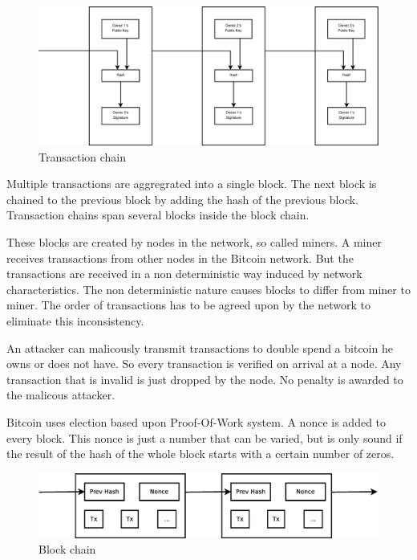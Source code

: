 \begin{figure}[H]
	\centerline{\includegraphics[scale=0.3]{problemDescription/figs/transactions.eps}}
	\caption{Transaction chain}
\end{figure}

Multiple transactions are aggregrated into a single block.
The next block is chained to the previous block by adding the hash of the previous block.
Transaction chains span several blocks inside the block chain.

These blocks are created by nodes in the network, so called miners.
A miner receives transactions from other nodes in the Bitcoin network.
But the transactions are received in a non deterministic way induced by network characteristics.
The non deterministic nature causes blocks to differ from miner to miner.
The order of transactions has to be agreed upon by the network to eliminate this inconsistency.

An attacker can malicously transmit transactions to double spend a bitcoin he owns or does not have.
So every transaction is verified on arrival at a node.
Any transaction that is invalid is just dropped by the node.
No penalty is awarded to the malicous attacker.

Bitcoin uses election based upon Proof-Of-Work system.
A nonce is added to every block. 
This nonce is just a number that can be varied,
but is only sound if the result of the hash of the whole block starts with a certain number of zeros.

\begin{figure}[H]
        \centerline{\includegraphics[scale=0.3]{problemDescription/figs/blocks.eps}}
        \caption{Block chain}
\end{figure}

